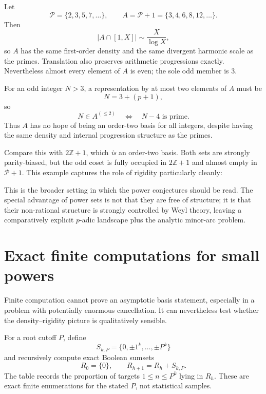\documentclass[../Axiomathic.tex]{subfiles}
\newcommand{\Z}{\mathbb Z}
\newcommand{\calP}{\mathcal P}
\begin{document}
Let
\[
  \calP=\{2,3,5,7,\ldots\},
  \qquad A=\calP+1=\{3,4,6,8,12,\ldots\}.
\]
Then
\[
  |A\cap[1,X]|\sim\frac{X}{\log X},
\]
so $A$ has the same first-order density and the same divergent harmonic scale as the primes.  Translation also preserves arithmetic progressions exactly.  Nevertheless almost every element of $A$ is even; the sole odd member is $3$.

For an odd integer $N>3$, a representation by at most two elements of $A$ must be
\[
  N=3+(p+1),
\]
so
\[
  N\in A^{(\le2)}\quad\Longleftrightarrow\quad N-4\text{ is prime}.
\]
Thus $A$ has no hope of being an order-two basis for all integers, despite having the same density and internal progression structure as the primes.

Compare this with $2\Z+1$, which \emph{is} an order-two basis.  Both sets are strongly parity-biased, but the odd coset is fully occupied in $2\Z+1$ and almost empty in $\calP+1$.  This example captures the role of rigidity particularly cleanly:
\begin{center}
\end{center}

This is the broader setting in which the power conjectures should be read.  The special advantage of power sets is not that they are free of structure; it is that their non-rational structure is strongly controlled by Weyl theory, leaving a comparatively explicit $p$-adic landscape plus the analytic minor-arc problem.

\section{Exact finite computations for small powers}

Finite computation cannot prove an asymptotic basis statement, especially in a problem with potentially enormous cancellation.  It can nevertheless test whether the density--rigidity picture is qualitatively sensible.

For a root cutoff $P$, define
\[
  S_{k,P}=\{0,\pm1^k,\ldots,\pm P^k\}
\]
and recursively compute exact Boolean sumsets
\[
  R_0=\{0\},\qquad R_{h+1}=R_h+S_{k,P}.
\]
The table records the proportion of targets $1\le n\le P^k$ lying in $R_h$.  These are exact finite enumerations for the stated $P$, not statistical samples.
\end{document}
